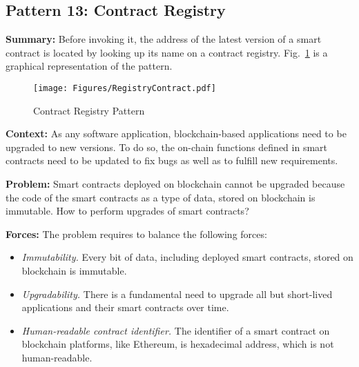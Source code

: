 
\subsection{ \textbf{Pattern 13: Contract Registry}}
\label{sec:registry}

\noindent \textbf{Summary:} Before invoking it, the address of the latest version of a smart contract is located by looking up its name on a contract registry. Fig.~\ref{fig:registry} is a graphical representation of the pattern.

\begin{figure}[t]
\begin{center}
\texttt{[image: Figures/RegistryContract.pdf]}
\caption{Contract Registry Pattern}\label{fig:registry}
\end{center}
\end{figure}

\vspace{0.5em}\noindent \textbf{Context:}
As any software application, blockchain-based applications need to be upgraded to new versions. To do so, the on-chain functions defined in smart contracts need to be updated to fix bugs as well as to fulfill
new requirements. 

\vspace{0.5em}\noindent \textbf{Problem:} 
Smart contracts deployed on blockchain cannot be upgraded because the code of the smart contracts as a type of data, stored on blockchain is immutable. How to perform upgrades of smart contracts? 

\vspace{0.5em}\noindent \textbf{Forces:} The problem requires to balance the following forces: \begin{itemize}
  \item \textit{Immutability.} Every bit of data, including deployed smart contracts, stored on blockchain is immutable.
  \item \textit{Upgradability.} There is a fundamental need to upgrade all but short-lived applications and their smart contracts over time. 
  \item \textit{Human-readable contract identifier.} The identifier of a smart contract on blockchain platforms, like Ethereum, is hexadecimal address, which is not human-readable.

\end{itemize}

